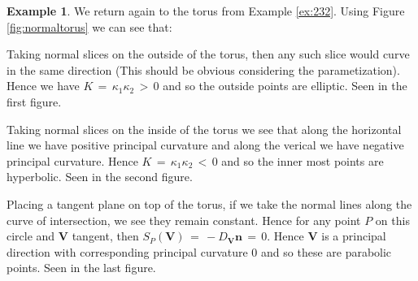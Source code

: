 \documentclass{UKZNcomp}
\newcommand{\vect}[1]{\mathbf{#1}} %
\theoremstyle{definition}
\newtheorem{example}[definition]{Example}
\theoremstyle{remark}
\begin{document}
\begin{example}
We return again to the torus from Example \ref{ex:232}. Using Figure \ref{fig:normaltorus} we can see that:

Taking normal slices on the outside of the torus, then any such slice would curve in the same direction (This should be obvious considering the parametization). Hence we have $K\,=\,\kappa_1\kappa_2\,>\,0$ and so the outside points are elliptic. Seen in the first figure.

Taking normal slices on the inside of the torus we see that along the horizontal line we have positive principal curvature and along the verical we have negative principal curvature. Hence $K\,=\,\kappa_1\kappa_2\,<\,0$ and so the inner most points are hyperbolic. Seen in the second figure.

Placing a tangent plane on top of the torus, if we take the normal lines along the curve of intersection, we see they remain constant. Hence for any point $P$ on this circle and $\vect V$ tangent, then $S_P(\vect V)\,=\,-D_{\vect V}\vect n\,=\,0$. Hence $\vect V$ is a principal direction with corresponding principal curvature 0 and so these are parabolic points. Seen in the last figure. 
\begin{figure}[H]

\end{figure}
\end{example}
\end{document}

